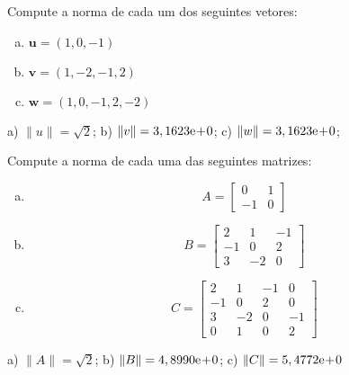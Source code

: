 \begin{exer}
  Compute a norma de cada um dos seguintes vetores:
  \begin{enumerate}[a)]
  \item $\displaystyle \pmb{u} = (1, 0, -1)$
  \item $\displaystyle \pmb{v} = (1, -2, -1, 2)$
  \item $\displaystyle \pmb{w} = (1, 0, -1, 2, -2)$
  \end{enumerate}
\end{exer}
\begin{resp}
  a) $\|u\| = \sqrt{2}$; b) $\|v\| = 3,1623\mathrm{e}\!+\!0$; c) $\|w\| = 3,1623\mathrm{e}\!+\!0$;
\end{resp}

\begin{exer}
  Compute a norma de cada uma das seguintes matrizes:
  \begin{enumerate}[a)]
  \item
    \begin{equation}
      A =
      \begin{bmatrix}
        0 & 1\\
        -1 & 0
      \end{bmatrix}
    \end{equation}
  \item 
    \begin{equation}
      B =
      \begin{bmatrix}
        2 & 1 & -1\\
        -1 & 0 & 2\\
        3 & -2 & 0
      \end{bmatrix}
    \end{equation}
  \item 
    \begin{equation}
      C =
      \begin{bmatrix}
        2 & 1 & -1 & 0\\
        -1 & 0 & 2 & 0\\
        3 & -2 & 0 & -1\\
        0 & 1 & 0 & 2
      \end{bmatrix}
    \end{equation}
  \end{enumerate}
\end{exer}
\begin{resp}
  a) $\|A\| = \sqrt{2}$; b) $\|B\| = 4,8990\mathrm{e}\!+\!0$; c) $\|C\| = 5,4772\mathrm{e}\!+\!0$
\end{resp}

